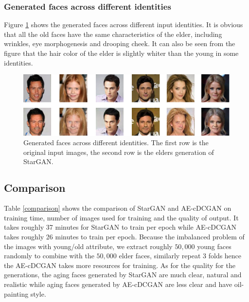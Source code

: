 \documentclass{article}
\begin{document}
\subsubsection{Generated faces across different identities}
Figure \ref{stargan_diff_identity} shows the generated faces across different input identities. It is obvious that all the old faces have the same characteristics of the elder, including wrinkles, eye morphogenesis and drooping cheek. It can also be seen from the figure that the hair color of the elder is slightly whiter than the young in some identities.

\begin{figure}[H]
\begin{center}
  \centering
  \includegraphics[width=5.5in]{image/stargan_diff_identity.png}
\end{center}
\caption{Generated faces across different identities. The first row is the original input images, the second row is the elders generation of StarGAN.}
\label{stargan_diff_identity}
\end{figure}

\subsection{Comparison}

Table \ref{comparison} shows the comparison of StarGAN and AE-cDCGAN on training time, number of images used for training and the quality of output. It takes roughly 37 minutes for StarGAN to train per epoch while AE-cDCGAN takes roughly 26 minutes to train per epoch. Because the imbalanced problem of the images with young/old attribute, we extract roughly $50,000$ young faces randomly to combine with the $50,000$ elder faces, similarly repeat 3 folds hence the AE-cDCGAN takes more resources for training. As for the quality for the generations, the aging faces generated by StarGAN are much clear, natural and realistic while aging faces generated by AE-cDCGAN are less clear and have oil-painting style.
\end{document}
